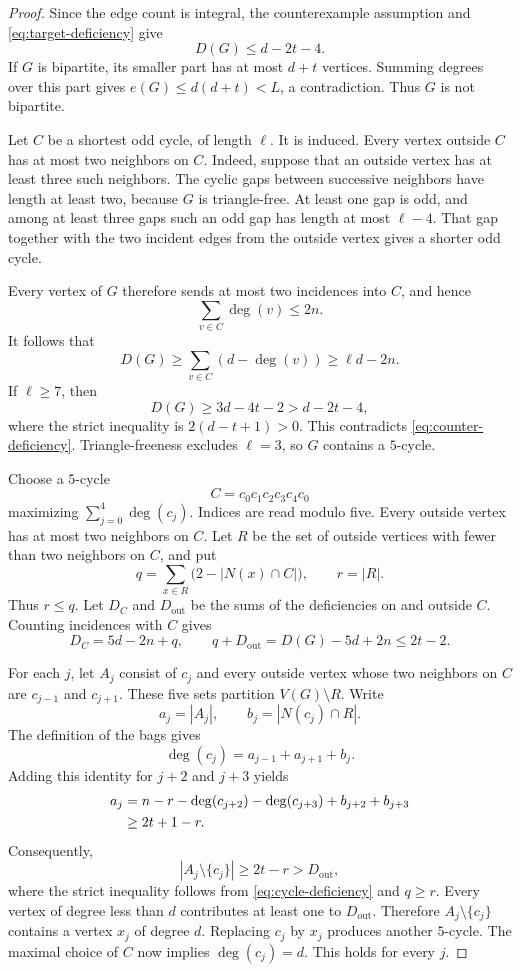 \documentclass[11pt]{article}
\theoremstyle{definition}
\theoremstyle{remark}
\newcommand{\N}{N}
\begin{document}
\begin{proof}
Since the edge count is integral, the counterexample assumption and
\cref{eq:target-deficiency} give
\begin{equation}\label{eq:counter-deficiency}
  D(G)\le d-2t-4.
\end{equation}
If $G$ is bipartite, its smaller part has at most $d+t$ vertices. Summing
degrees over this part gives $e(G)\le d(d+t)<L$, a contradiction. Thus $G$ is
not bipartite.

Let $C$ be a shortest odd cycle, of length $\ell$. It is induced. Every
vertex outside $C$ has at most two neighbors on $C$. Indeed, suppose that an
outside vertex has at least three such neighbors. The cyclic gaps between
successive neighbors have length at least two, because $G$ is triangle-free.
At least one gap is odd, and among at least three gaps such an odd gap has
length at most $\ell-4$. That gap together with the two incident edges from
the outside vertex gives a shorter odd cycle.

Every vertex of $G$ therefore sends at most two incidences into $C$, and hence
\[
  \sum_{v\in C}\deg(v)\le2n.
\]
It follows that
\[
  D(G)\ge\sum_{v\in C}(d-\deg(v))\ge \ell d-2n.
\]
If $\ell\ge7$, then
\[
  D(G)\ge3d-4t-2>d-2t-4,
\]
where the strict inequality is $2(d-t+1)>0$. This contradicts
\cref{eq:counter-deficiency}. Triangle-freeness excludes $\ell=3$, so $G$
contains a $5$-cycle.

Choose a $5$-cycle
\[
  C=c_0c_1c_2c_3c_4c_0
\]
maximizing $\sum_{j=0}^4\deg(c_j)$. Indices are read modulo five. Every
outside vertex has at most two neighbors on $C$. Let $R$ be the set of outside
vertices with fewer than two neighbors on $C$, and put
\[
  q=\sum_{x\in R}\bigl(2-|\N(x)\cap C|\bigr),
  \qquad r=|R|.
\]
Thus $r\le q$. Let $D_C$ and $D_{\mathrm{out}}$ be the sums of the
deficiencies on and outside $C$. Counting incidences with $C$ gives
\begin{equation}\label{eq:cycle-deficiency}
  D_C=5d-2n+q,
  \qquad
  q+D_{\mathrm{out}}=D(G)-5d+2n\le2t-2.
\end{equation}

For each $j$, let $A_j$ consist of $c_j$ and every outside vertex whose two
neighbors on $C$ are $c_{j-1}$ and $c_{j+1}$. These five sets partition
$V(G)\setminus R$. Write
\[
  a_j=|A_j|,
  \qquad
  b_j=|\N(c_j)\cap R|.
\]
The definition of the bags gives
\[
  \deg(c_j)=a_{j-1}+a_{j+1}+b_j.
\]
Adding this identity for $j+2$ and $j+3$ yields
\begin{align}
  a_j
    &=n-r-\deg(c_{j+2})-\deg(c_{j+3})+b_{j+2}+b_{j+3}\notag\\
    &\ge2t+1-r.\label{eq:bag-lower}
\end{align}
Consequently,
\[
  |A_j\setminus\{c_j\}|\ge2t-r>D_{\mathrm{out}},
\]
where the strict inequality follows from \cref{eq:cycle-deficiency} and
$q\ge r$. Every vertex of degree less than $d$ contributes at least one to
$D_{\mathrm{out}}$. Therefore $A_j\setminus\{c_j\}$ contains a vertex $x_j$
of degree $d$. Replacing $c_j$ by $x_j$ produces another $5$-cycle. The
maximal choice of $C$ now implies $\deg(c_j)=d$. This holds for every $j$.
\end{proof}
\end{document}
